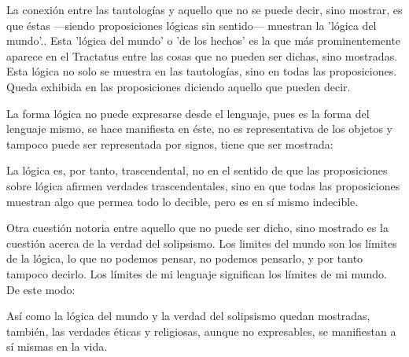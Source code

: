 La conexión entre las tautologías y aquello que no se puede decir, sino
mostrar, es que éstas ---siendo proposiciones lógicas sin sentido--- muestran
la 'lógica del mundo'.\autocite[cf.~][p.~163~\S3]{IWT}. Esta 'lógica del
mundo' o 'de los hechos' es la que más prominentemente aparece en el Tractatus
entre las cosas que no pueden ser dichas, sino mostradas. Esta lógica no solo
se muestra en las tautologías, sino en todas las proposiciones. Queda exhibida
en las proposiciones diciendo aquello que pueden decir.

La forma lógica no puede expresarse desde el lenguaje, pues es la forma del
lenguaje mismo, se hace manifiesta en éste, no es representativa de los objetos
y tampoco puede ser representada por signos, tiene que ser mostrada:

La lógica es, por tanto, trascendental, no en el sentido de que las
proposiciones sobre lógica afirmen verdades trascendentales, sino en que todas
las proposiciones muestran algo que permea todo lo decible, pero es en sí mismo
indecible.\autocite[cf.~][p.~166 \S2]{IWT}

Otra cuestión notoria entre aquello que no puede ser dicho, sino mostrado es la
cuestión acerca de la verdad del solipsismo. Los limites del mundo son los
límites de la lógica, lo que no podemos pensar, no podemos pensarlo, y por tanto
tampoco decirlo. Los límites de mi lenguaje significan los límites de mi
mundo.\autocite[cf~.][5.6~y~5.61]{tractatus} De este modo:

Así como la lógica del mundo y la verdad del solipsismo quedan mostradas,
también, las verdades éticas y religiosas, aunque no expresables, se manifiestan
a sí mismas en la vida. 

